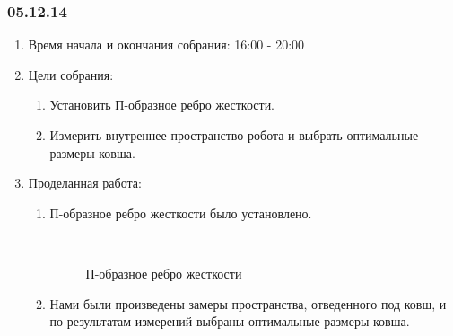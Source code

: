 \subsubsection{05.12.14}

\begin{enumerate}
	\item Время начала и окончания собрания:
	16:00 - 20:00
	\item Цели собрания:
	\begin{enumerate}
	  \item Установить П-образное ребро жесткости.
	  
	  \item Измерить внутреннее пространство робота и выбрать оптимальные размеры ковша.
	  
    \end{enumerate}
	\item Проделанная работа:
	\begin{enumerate}
	  \item П-образное ребро жесткости было установлено.
	  
	  \begin{figure}[H]
	  	\begin{minipage}[h]{0.2\linewidth}
	  		\center  
	  	\end{minipage}
	  	\begin{minipage}[h]{0.6\linewidth}
	  		\caption{П-образное ребро жесткости}
	  	\end{minipage}
	  \end{figure}
	  
	  \item Нами были произведены замеры пространства, отведенного под ковш, и по результатам измерений выбраны оптимальные размеры ковша.
	  

\end{enumerate}
\end{enumerate}
